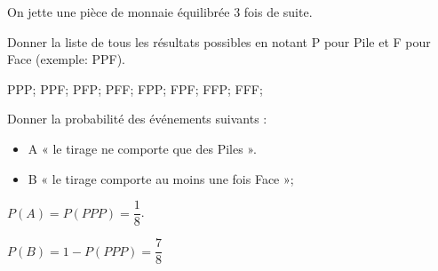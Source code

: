 \exoCorr{}

On jette une pièce de monnaie équilibrée 3 fois de suite.

\question{} 
Donner la liste de tous les résultats possibles en notant P pour Pile et F pour Face (exemple: PPF).

PPP;
PPF;
PFP;
PFF;
FPP;
FPF;
FFP;
FFF;


\question{} 
Donner la probabilité des événements suivants :

\begin{itemize}
\item A « le tirage ne comporte que des Piles ».
\item B « le tirage comporte au moins une fois Face »;
\end{itemize}

$P(A) = P(PPP) = \dfrac{1}{8}$.

$P(B) = 1-P(PPP) = \dfrac{7}{8}$

